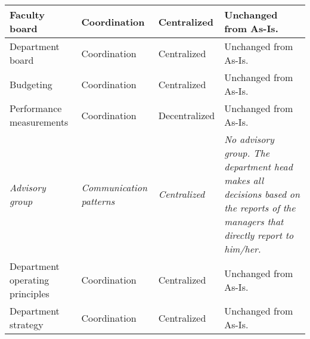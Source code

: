 \begin{center}
\begin{longtable}{ | p{} | p{}| p{} | p{}|}
 Faculty board &
 Coordination &
 Centralized &
 Unchanged from As-Is. \\
%
\hline
%
%
 Department board &
 Coordination &
 Centralized &
 Unchanged from As-Is. \\
%
\hline
%
 Budgeting &
 Coordination &
 Centralized &
 Unchanged from As-Is. \\
%
\hline
%
%
 Performance measurements &
 Coordination &
 Decentralized &
 Unchanged from As-Is.  \\
%
\hline
%
 \textit{Advisory group} &
 \textit{Communication patterns} &
 \textit{Centralized} &
 \textit{No advisory group. The department head makes all decisions based on the reports of the managers that directly report to him/her.} \\ 
%
\hline
%
%
 Department operating principles &
 Coordination &
 Centralized &
 Unchanged from As-Is. \\
%
\hline
%
%
 Department strategy &
 Coordination &
 Centralized &
 Unchanged from As-Is. \\
%
\hline

\end{longtable}
\end{center}


